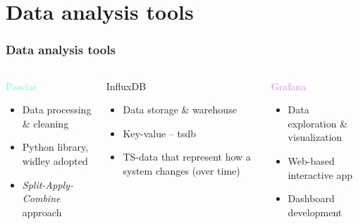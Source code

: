 \section{Data analysis tools}
\SectionPage

\begin{frame}
    \frametitle{Data analysis tools}
    \vspace*{\fill}
    \begin{columns}[onlytextwidth, t]
        \begin{column}{.33\textwidth}
            \centering
            \textcolor{Aquamarine}{\Large Pandas}
            \vspace{0.5cm}

            \begin{itemize}
                \item Data processing \& cleaning
                \item Python library, widley adopted
                \item \textit{Split-Apply-Combine} approach
            \end{itemize}
        \end{column}

        \begin{column}{.33\textwidth}
            \centering
            \textcolor{YellowOrange}{\Large InfluxDB}
            \vspace{0.5cm}

            \begin{itemize}
                \item Data storage \& warehouse
                \item Key-value -- \acl{tsdb}
                \item TS-data that represent how a system changes (over time)
            \end{itemize}
        \end{column}


        \begin{column}{.33\textwidth}
            \centering
            \textcolor{violet}{\Large Grafana}
            \vspace{0.5cm}

            \begin{itemize}
                \item Data exploration \& visualization
                \item Web-based interactive app
                \item Dashboard development
            \end{itemize}
        \end{column}
    \end{columns}
    \vspace*{\fill}
\end{frame}
